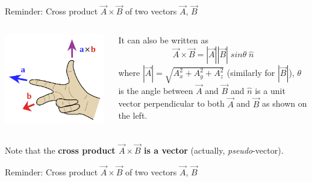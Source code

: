 {\begin{frame}{Reminder: Cross product $\vec{A} \times \vec{B}$ of two vectors $\vec{A}$, $\vec{B}$}
\begin{columns}
  \begin{column}{0.30\textwidth}
   \begin{center}
     \includegraphics[width=0.98\textwidth]{./images/schematics/right_hand_rule_abc_3.png}\\
   \end{center}
  \end{column}
  \begin{column}{0.70\textwidth}
    It can also be written as
    \begin{equation*}
    \vec{A} \times \vec{B} = |\vec{A}| |\vec{B}| \; sin\theta \; \hat{n}
    \end{equation*}
    where $|\vec{A}| = \sqrt{A_x^2+A_y^2+A_z^2}$ (similarly for $|\vec{B}|$), $\theta$ is the
    angle between $\vec{A}$ and $\vec{B}$ and $\hat{n}$ is a unit vector perpendicular to both
    $\vec{A}$ and $\vec{B}$ as shown on the left.
  \end{column}
\end{columns}

\vspace{0.3cm}

Note that the {\bf cross product $\vec{A} \times \vec{B}$ is a vector} (actually, {\em pseudo}-vector).

\end{frame}


%
%
%

\begin{frame}{Reminder: Cross product $\vec{A} \times \vec{B}$ of two vectors $\vec{A}$, $\vec{B}$}


\end{frame}}
